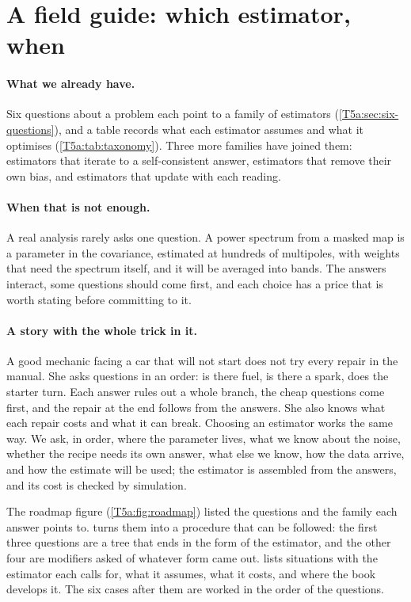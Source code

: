 \section{A field guide: which estimator, when}
\label{T5b:sec:field-guide}

\paragraph{What we already have.}
Six questions about a problem each point to a family of estimators
(\cref{T5a:sec:six-questions}), and a table records what each estimator assumes
and what it optimises (\cref{T5a:tab:taxonomy}). Three more families have
joined them: estimators that iterate to a
self-consistent answer, estimators that remove their own bias, and
estimators that update with each reading.

\paragraph{When that is not enough.}
A real analysis rarely asks one question. A power spectrum from a masked
map is a parameter in the covariance, estimated at hundreds of multipoles,
with weights that need the spectrum itself, and it will be averaged into
bands. The answers interact, some questions should come first, and each
choice has a price that is worth stating before committing to it.

\paragraph{A story with the whole trick in it.}
A good mechanic facing a car that will not start does not try every repair
in the manual. She asks questions in an order: is there fuel, is there a
spark, does the starter turn. Each answer rules out a whole branch, the
cheap questions come first, and the repair at the end follows from the
answers. She also knows what each repair costs and what it can break.
Choosing an estimator works the same way. We ask, in order, where the
parameter lives, what we know about the noise, whether the recipe needs
its own answer, what else we know, how the data arrive, and how the
estimate will be used; the estimator is assembled from the answers, and
its cost is checked by simulation.

The roadmap figure (\cref{T5a:fig:roadmap}) listed the questions and the family
each answer points to.  turns them into a
procedure that can be followed: the first three questions are a tree that ends
in the form of the estimator, and the other four are modifiers asked of
whatever form came out.  lists situations with the
estimator each calls for, what it assumes, what it costs, and where the book
develops it. The six cases after them are worked in the order of the questions.


